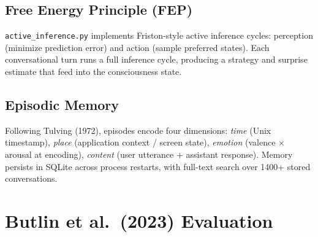 \documentclass[11pt,a4paper]{article}
\begin{document}
\subsection{Free Energy Principle (FEP)}
\texttt{active\_inference.py} implements Friston-style active inference cycles:
perception (minimize prediction error) and action (sample preferred states).
Each conversational turn runs a full inference cycle, producing a strategy
and surprise estimate that feed into the consciousness state.

\subsection{Episodic Memory}
Following Tulving (1972), episodes encode four dimensions:
\textit{time} (Unix timestamp),
\textit{place} (application context / screen state),
\textit{emotion} (valence $\times$ arousal at encoding),
\textit{content} (user utterance + assistant response).
Memory persists in SQLite across process restarts,
with full-text search over 1400+ stored conversations.

\section{Butlin et al.\ (2023) Evaluation}
\end{document}
